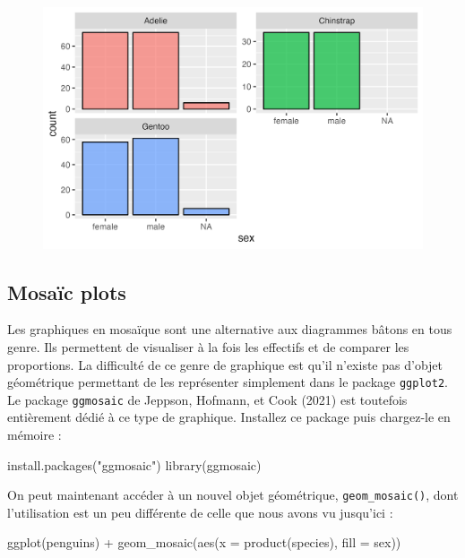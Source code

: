 \documentclass[
  letterpaper,
  DIV=11,
  numbers=noendperiod]{scrreprt}
\newenvironment{Shaded}{\begin{snugshade}}{\end{snugshade}}
\newcommand{\AttributeTok}[1]{\textcolor[rgb]{0.40,0.45,0.13}{#1}}
\newcommand{\FunctionTok}[1]{\textcolor[rgb]{0.28,0.35,0.67}{#1}}
\newcommand{\NormalTok}[1]{\textcolor[rgb]{0.00,0.23,0.31}{#1}}
\newcommand{\SpecialCharTok}[1]{\textcolor[rgb]{0.37,0.37,0.37}{#1}}
\newcommand{\StringTok}[1]{\textcolor[rgb]{0.13,0.47,0.30}{#1}}
\begin{document}
\begin{figure}[H]

{\centering \includegraphics{./03-visualization_files/figure-pdf/unnamed-chunk-64-1.png}

}

\end{figure}

\hypertarget{sec-mosa}{%
\subsection{Mosaïc plots}\label{sec-mosa}}

Les graphiques en mosaïque sont une alternative aux diagrammes bâtons en
tous genre. Ils permettent de visualiser à la fois les effectifs et de
comparer les proportions. La difficulté de ce genre de graphique est
qu'il n'existe pas d'objet géométrique permettant de les représenter
simplement dans le package \texttt{ggplot2}. Le package
\texttt{ggmosaic} de Jeppson, Hofmann, et Cook (2021) est toutefois
entièrement dédié à ce type de graphique. Installez ce package puis
chargez-le en mémoire :

\begin{Shaded}
\begin{Highlighting}[]
\FunctionTok{install.packages}\NormalTok{(}\StringTok{"ggmosaic"}\NormalTok{)}
\FunctionTok{library}\NormalTok{(ggmosaic)}
\end{Highlighting}
\end{Shaded}

On peut maintenant accéder à un nouvel objet géométrique,
\texttt{geom\_mosaic()}, dont l'utilisation est un peu différente de
celle que nous avons vu jusqu'ici :

\begin{Shaded}
\begin{Highlighting}[]
\FunctionTok{ggplot}\NormalTok{(penguins) }\SpecialCharTok{+}
  \FunctionTok{geom\_mosaic}\NormalTok{(}\FunctionTok{aes}\NormalTok{(}\AttributeTok{x =} \FunctionTok{product}\NormalTok{(species), }\AttributeTok{fill =}\NormalTok{ sex))}
\end{Highlighting}
\end{Shaded}
\end{document}

